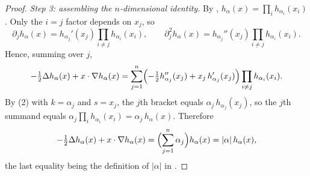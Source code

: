 \begin{proof}
\emph{Step 3: assembling the $n$-dimensional identity.}
By , $h_\alpha(x) = \prod_{i} h_{\alpha_i}(x_i)$.  Only the
$i = j$ factor depends on $x_j$, so
\[
  \partial_j h_\alpha(x) = h_{\alpha_j}'(x_j)\prod_{i\neq j} h_{\alpha_i}(x_i),
  \qquad
  \partial_j^2 h_\alpha(x) = h_{\alpha_j}''(x_j)\prod_{i\neq j} h_{\alpha_i}(x_i).
\]
Hence, summing over $j$,
\[
  -\tfrac12\Delta h_\alpha(x) + x\cdot\nabla h_\alpha(x)
    = \sum_{j=1}^n
      \Bigl(-\tfrac12 h_{\alpha_j}''(x_j) + x_j\, h_{\alpha_j}'(x_j)\Bigr)
      \prod_{i\neq j} h_{\alpha_i}(x_i).
\]
By (2) with $k = \alpha_j$ and $s = x_j$, the $j$th bracket equals
$\alpha_j\, h_{\alpha_j}(x_j)$, so the $j$th summand equals
$\alpha_j \prod_{i} h_{\alpha_i}(x_i) = \alpha_j\, h_\alpha(x)$.  Therefore
\[
  -\tfrac12\Delta h_\alpha(x) + x\cdot\nabla h_\alpha(x)
    = \Bigl(\sum_{j=1}^n \alpha_j\Bigr) h_\alpha(x)
    = |\alpha|\, h_\alpha(x),
\]
the last equality being the definition of $|\alpha|$ in
.
\end{proof}
